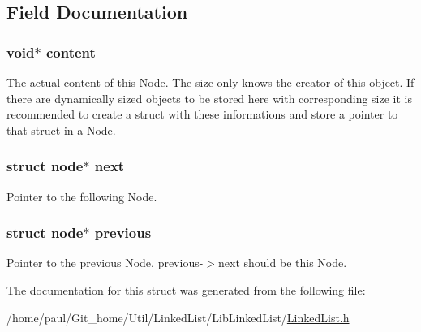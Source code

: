 \subsection{Field Documentation}
\hypertarget{structnode_a3d6d14728fec84498eff595a3e31d15a}{
\subsubsection[{content}]{\setlength{\rightskip}{0pt plus 5cm}void$\ast$ content}}\label{structnode_a3d6d14728fec84498eff595a3e31d15a}
The actual content of this Node. The size only knows the creator of this object. If there are dynamically sized objects to be stored here with corresponding size it is recommended to create a struct with these informations and store a pointer to that struct in a Node. \hypertarget{structnode_a0dc1b6470487aa86d9936e3cab8b95be}{
\subsubsection[{next}]{\setlength{\rightskip}{0pt plus 5cm}struct {\bf node}$\ast$ next}}\label{structnode_a0dc1b6470487aa86d9936e3cab8b95be}
Pointer to the following Node. \hypertarget{structnode_aba783da56f092df6846bd3b7b9555728}{
\subsubsection[{previous}]{\setlength{\rightskip}{0pt plus 5cm}struct {\bf node}$\ast$ previous}}\label{structnode_aba783da56f092df6846bd3b7b9555728}
Pointer to the previous Node. previous-\/$>$next should be this Node. 

The documentation for this struct was generated from the following file\-:\begin{DoxyCompactItemize}
\item 
/home/paul/\-Git\-\_\-home/\-Util/\-Linked\-List/\-Lib\-Linked\-List/\hyperlink{_linked_list_8h}{Linked\-List.\-h}\end{DoxyCompactItemize}
